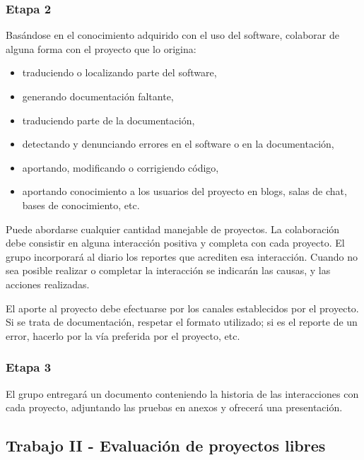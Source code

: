\subsubsection{Etapa 2} 
Basándose en el conocimiento adquirido con el uso del software, colaborar de alguna forma con el proyecto que lo origina: 
\begin{itemize}
	\item traduciendo o localizando parte del software,
	\item generando documentación faltante, 
	\item traduciendo parte de la documentación, 
	\item detectando y denunciando errores en el software o en la documentación,
	\item aportando, modificando o corrigiendo código,
	\item aportando conocimiento a los usuarios del proyecto en blogs, salas de chat, bases de conocimiento, etc.
\end{itemize}
Puede abordarse cualquier cantidad manejable de proyectos. La colaboración debe consistir en alguna interacción positiva y completa con cada proyecto. El grupo incorporará al diario los reportes que acrediten esa interacción. Cuando no sea posible realizar o completar la interacción se indicarán las causas, y las acciones realizadas.

El aporte al proyecto debe efectuarse por los canales establecidos por el proyecto. Si se trata de documentación, respetar el formato utilizado; si es el reporte de un error, hacerlo por la vía preferida por el proyecto, etc.

\subsubsection{Etapa 3} 
El grupo entregará un documento conteniendo la historia de las interacciones con cada proyecto, adjuntando las pruebas en anexos y ofrecerá una presentación.

\subsection {Trabajo II - Evaluación de proyectos libres}

